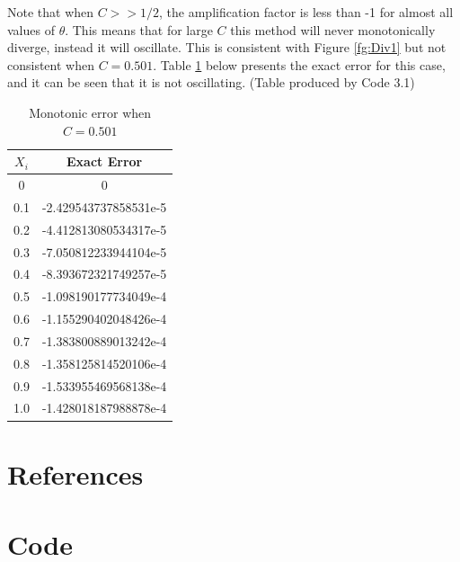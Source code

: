 \documentclass[10pt,a4paper,notitlepage]{article}
\begin{document}
Note that when $C>>1/2$, the amplification factor is less than -1 for almost all values of $\theta$. This means that for large $C$ this method will never monotonically diverge, instead it will oscillate. This is consistent with Figure \ref{fg:Div1} but not consistent when $C=0.501$. Table \ref{tb:NonOsc} below presents the exact error for this case, and it can be seen that it is not oscillating. (Table produced by Code 3.1)
\begin{table}[H]
\centering
\begin{tabular}{|c|c|}
\hline $X_{i}$ & Exact Error \\ \hline 0 & 0\\ 0.1 & -2.429543737858531e-5\\ 0.2 & -4.412813080534317e-5\\ 0.3 & -7.050812233944104e-5\\ 0.4 & -8.393672321749257e-5\\ 0.5 & -1.098190177734049e-4\\ 0.6 & -1.155290402048426e-4\\ 0.7 & -1.383800889013242e-4\\ 0.8 & -1.358125814520106e-4\\ 0.9 & -1.533955469568138e-4\\ 1.0 & -1.428018187988878e-4\\ \hline
\end{tabular}
\caption{Monotonic error when $C=0.501$}
\label{tb:NonOsc}
\end{table}

\section*{\centering References}\label{References}
\printbibliography[heading=none]

\pagebreak
\section*{\centering Code}
\end{document}
